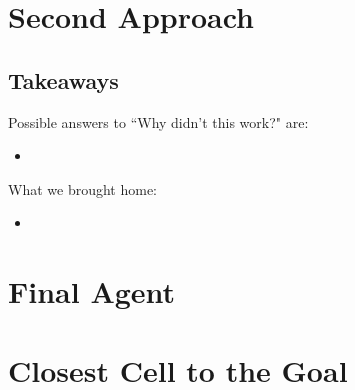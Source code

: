 \section{Second Approach}
\label{sec:second_approach}

\subsection{Takeaways}

Possible answers to ``Why didn't this work?" are:
\begin{itemize}
  \item
\end{itemize}

What we brought home:
\begin{itemize}
  \item
\end{itemize}

\section{Final Agent}
\label{sec:final_agent}

\section{Closest Cell to the Goal}
\label{sec:closest_cell_to_the_goal}